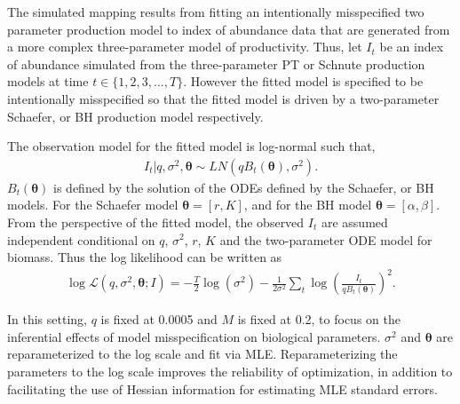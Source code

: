 %
The simulated mapping results from fitting an intentionally misspecified two
parameter production model to index of abundance data that are generated from
a more complex three-parameter model of productivity.
Thus, let $I_t$ be an index of abundance simulated from the three-parameter PT
or Schnute production models at time $t\in\{1,2, 3,..., T\}$. However the
fitted model is specified to be intentionally misspecified so that the fitted
model is driven by a two-parameter Schaefer, or BH production model respectively. %

%
The observation model for the fitted model is log-normal such that,
%
\begin{align}
I_t| q, \sigma^2, \bm{\theta} \sim LN(qB_t(\bm{\theta}), \sigma^2).
\end{align}
%
$B_t(\bm{\theta})$ is defined by the solution of the ODEs defined by the Schaefer, or BH models.
%
For the Schaefer model $\bm{\theta}=[r, K]$, {\color{red}and for the BH model $\bm{\theta}=[\alpha, \beta]$.}
%
From the perspective of the fitted model, the observed $I_t$ are assumed independent
conditional on $q$, $\sigma^2$, $r$, $K$ and the two-parameter ODE model for biomass.
Thus the log likelihood can be written as
%
\begin{align}
\log\mathcal{L}(q, \sigma^2, \bm{\theta}; I) = - \frac{T}{2}\log(\sigma^2) - \frac{1}{2\sigma^2}\sum_t \log\left(\frac{I_t}{qB_t(\bm{\theta})}\right)^2. \label{logLike}
\end{align}

%
In this setting, $q$ is fixed at 0.0005 and $M$ is fixed at 0.2, to focus on
the inferential effects of model misspecification on biological parameters.
$\sigma^2$ and $\bm{\theta}$ are reparameterized to the log scale
and fit via MLE.
Reparameterizing the parameters to the log scale improves the reliability
of optimization, in addition to facilitating the use of Hessian information
for estimating MLE standard errors.

